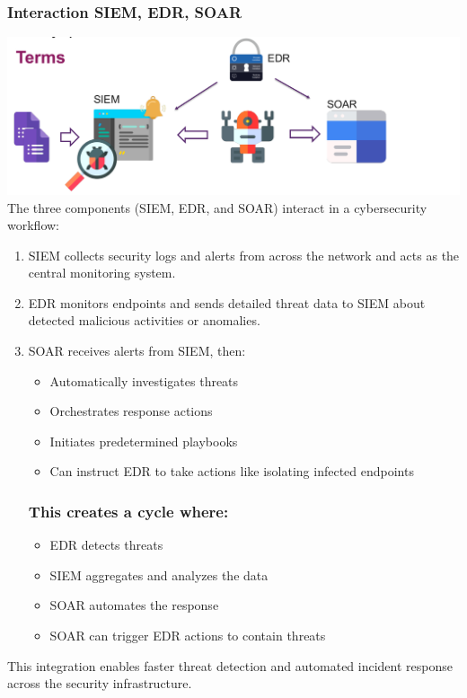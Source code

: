 \subsubsection{Interaction SIEM, EDR, SOAR}
\includegraphics[width=\textwidth]{resources/04-interaction-security-operation-center.png}
The three components (SIEM, EDR, and SOAR) interact in a cybersecurity workflow:
\begin{enumerate}
	\item SIEM collects security logs and alerts from across the network and acts as the central monitoring system.
	\item EDR monitors endpoints and sends detailed threat data to SIEM about detected malicious activities or anomalies.
	\item SOAR receives alerts from SIEM, then:
  \begin{itemize}
    \tightlist
		\item Automatically investigates threats
		\item Orchestrates response actions
		\item Initiates predetermined playbooks
		\item Can instruct EDR to take actions like isolating infected endpoints
  \end{itemize}
  \subsubsection*{This creates a cycle where:}
  \begin{itemize}
    \tightlist
		\item EDR detects threats
		\item SIEM aggregates and analyzes the data
		\item SOAR automates the response
		\item SOAR can trigger EDR actions to contain threats
  \end{itemize}
\end{enumerate}
This integration enables faster threat detection and automated incident response across the security infrastructure.

